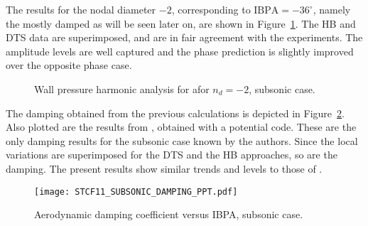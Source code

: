The results for the  nodal  diameter $-2$, corresponding to $\text{IBPA}=-36^\circ$, namely
the mostly damped as will be seen later on, are shown
in Figure~\ref{fig:stcf11_ael_subsonic_ibpa_324_paper}. The HB and DTS data
are superimposed, and are in fair agreement with the experiments. The
amplitude levels are well captured and the phase prediction is
slightly improved over the opposite phase case.
\begin{figure}[htp]
  \centering
  \caption{Wall pressure harmonic analysis for afor \mbox{$n_d=-2$}, subsonic case.}
  \label{fig:stcf11_ael_subsonic_ibpa_324_paper}
\end{figure}

The damping obtained from the previous calculations is depicted 
in Figure~\ref{fig:stcf11_subsonic_damping}.  Also plotted are the results
from \citet{Fransson1999}, obtained with a
potential code.
These are the only damping results for the
subsonic case known by the authors.  Since the local variations are
superimposed for the DTS and the HB approaches, so are the damping.
The present
results show similar trends and levels to those of \citet{Fransson1999}.
\begin{figure}[htp]
  \centering
  \texttt{[image: STCF11\_SUBSONIC\_DAMPING\_PPT.pdf]}
  \caption{Aerodynamic damping coefficient versus IBPA, subsonic case.}
  \label{fig:stcf11_subsonic_damping}
\end{figure}